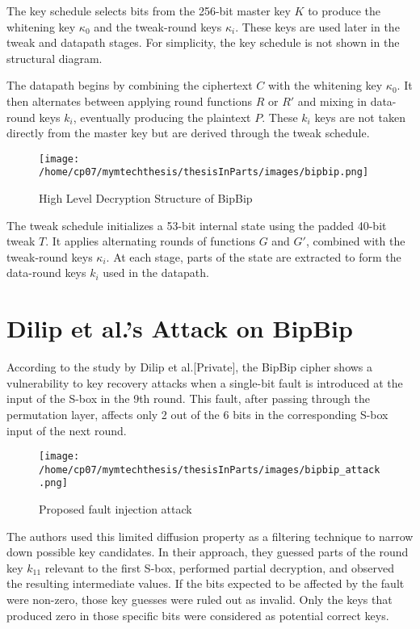 The key schedule selects bits from the 256-bit master key $K$ to produce the whitening key $\kappa_0$ and the tweak-round keys $\kappa_i$. These keys are used later in the tweak and datapath stages. For simplicity, the key schedule is not shown in the structural diagram.

The datapath begins by combining the ciphertext $C$ with the whitening key $\kappa_0$. It then alternates between applying round functions $R$ or $R'$ and mixing in data-round keys $k_i$, eventually producing the plaintext $P$. These $k_i$ keys are not taken directly from the master key but are derived through the tweak schedule.
\begin{figure}[h]
    \centering
    \texttt{[image: /home/cp07/mymtechthesis/thesisInParts/images/bipbip.png]}
    \caption{High Level Decryption Structure of BipBip}
    \label{fig:bipbip_decrypt_structure}
\end{figure}


The tweak schedule initializes a 53-bit internal state using the padded 40-bit tweak $T$. It applies alternating rounds of functions $G$ and $G'$, combined with the tweak-round keys $\kappa_i$. At each stage, parts of the state are extracted to form the data-round keys $k_i$ used in the datapath.

\section{Dilip et al.'s Attack on BipBip}
According to the study by Dilip et al.[Private], the BipBip cipher shows a vulnerability to key recovery attacks when a single-bit fault is introduced at the input of the S-box in the 9th round. This fault, after passing through the permutation layer, affects only 2 out of the 6 bits in the corresponding S-box input of the next round. 
\begin{figure}[h]
    \centering
    \texttt{[image: /home/cp07/mymtechthesis/thesisInParts/images/bipbip\_attack.png]}
    \caption{Proposed fault injection attack}
    \label{fig:bipbip_attack}
\end{figure}
The authors used this limited diffusion property as a filtering technique to narrow down possible key candidates.
In their approach, they guessed parts of the round key $k_{11}$ relevant to the first S-box, performed partial decryption, and observed the resulting intermediate values. If the bits expected to be affected by the fault were non-zero, those key guesses were ruled out as invalid. Only the keys that produced zero in those specific bits were considered as potential correct keys.




